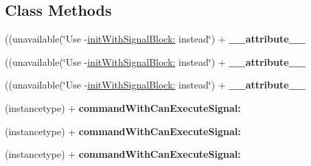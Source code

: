 \subsection*{Class Methods}
\begin{DoxyCompactItemize}
\item 
\mbox{\label{interface_r_a_c_command_a191b2d1f4e349debb5366667ecbff084}} 
((unavailable(\char`\"{}Use -\/\mbox{\hyperlink{interface_r_a_c_command_ac1adc323edfb8a4c0beaff631ab76704}{init\+With\+Signal\+Block\+:}} instead\char`\"{}) + {\bfseries \+\_\+\+\_\+attribute\+\_\+\+\_\+}
\item 
\mbox{\label{interface_r_a_c_command_a191b2d1f4e349debb5366667ecbff084}} 
((unavailable(\char`\"{}Use -\/\mbox{\hyperlink{interface_r_a_c_command_ac1adc323edfb8a4c0beaff631ab76704}{init\+With\+Signal\+Block\+:}} instead\char`\"{}) + {\bfseries \+\_\+\+\_\+attribute\+\_\+\+\_\+}
\item 
\mbox{\label{interface_r_a_c_command_a191b2d1f4e349debb5366667ecbff084}} 
((unavailable(\char`\"{}Use -\/\mbox{\hyperlink{interface_r_a_c_command_ac1adc323edfb8a4c0beaff631ab76704}{init\+With\+Signal\+Block\+:}} instead\char`\"{}) + {\bfseries \+\_\+\+\_\+attribute\+\_\+\+\_\+}
\item 
\mbox{\label{interface_r_a_c_command_ac16216cd8194a17a05e139e390a237db}} 
(instancetype) + {\bfseries command\+With\+Can\+Execute\+Signal\+:}
\item 
\mbox{\label{interface_r_a_c_command_ac16216cd8194a17a05e139e390a237db}} 
(instancetype) + {\bfseries command\+With\+Can\+Execute\+Signal\+:}
\item 
\mbox{\label{interface_r_a_c_command_ac16216cd8194a17a05e139e390a237db}} 
(instancetype) + {\bfseries command\+With\+Can\+Execute\+Signal\+:}
\end{DoxyCompactItemize}
